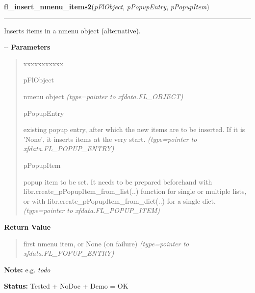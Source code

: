    \vspace{0.5ex}

\hspace{.8\funcindent}\begin{boxedminipage}{\funcwidth}

    \raggedright \textbf{fl\_insert\_nmenu\_items2}(\textit{pFlObject}, \textit{pPopupEntry}, \textit{pPopupItem})

    \vspace{-1.5ex}

    \rule{\textwidth}{0.5\fboxrule}
\setlength{\parskip}{2ex}

Inserts items in a nmenu object (alternative).

-{}-
\setlength{\parskip}{1ex}
      \textbf{Parameters}
      \vspace{-1ex}

      \begin{quote}
        \begin{Ventry}{xxxxxxxxxxx}

          \item[pFlObject]


nmenu object
            {\it (type=pointer to xfdata.FL\_OBJECT)}

          \item[pPopupEntry]


existing popup entry, after which the new items are to be inserted.
If it is 'None', it inserts items at the very start.
            {\it (type=pointer to xfdata.FL\_POPUP\_ENTRY)}

          \item[pPopupItem]


popup item to be set. It needs to be prepared beforehand with
libr.create\_pPopupItem\_from\_list(..) function for single or multiple
lists, or with libr.create\_pPopupItem\_from\_dict(..) for a single dict.
            {\it (type=pointer to xfdata.FL\_POPUP\_ITEM)}

        \end{Ventry}

      \end{quote}

      \textbf{Return Value}
    \vspace{-1ex}

      \begin{quote}

first nmenu item, or None (on failure)
      {\it (type=pointer to xfdata.FL\_POPUP\_ENTRY)}

      \end{quote}

\textbf{Note:} 
e.g. \emph{todo}


\textbf{Status:} 
Tested + NoDoc + Demo = OK


    \end{boxedminipage}

